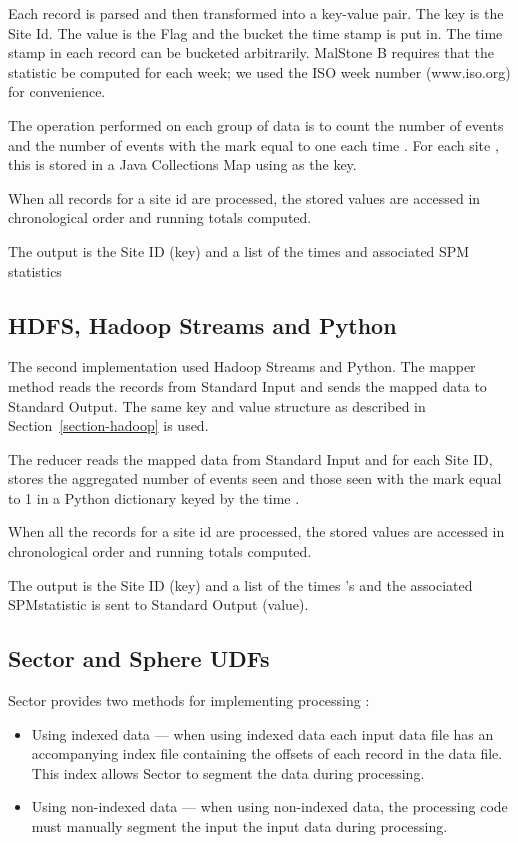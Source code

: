 \documentclass{acm_proc_article-sp}
\def\spm{\mbox{SPM}}
\def\malstone{MalStone } \def\malgen{MalGen }
\begin{document}
Each record is parsed and then transformed into a key-value pair.  The
key is the Site Id.  The value is the Flag and the bucket the time
stamp is put in.  The time stamp in each record can be bucketed
arbitrarily.  \malstone B requires that the statistic be computed for
each week; we used the ISO week number (www.iso.org) for convenience.

The operation performed on each group of data is to count the number
of events and the number of events with the mark equal to one
each time .  For each site , this is stored in a Java Collections
Map using  as the key.

When all records for a site id are processed, the stored values are
accessed in chronological order and running totals computed.

The output is the Site ID (key)  and a list of the times  and 
associated SPM statistics 

\subsection{HDFS, Hadoop Streams and Python}

The second implementation used Hadoop Streams \cite{Hadoop:2010} and 
Python.  The mapper method reads the records from Standard Input
and sends the mapped data to Standard Output.  The same key and value structure
as described in Section~\ref{section-hadoop} is used.

The reducer reads the mapped data from Standard Input and for each
Site ID, stores the aggregated number of events seen and those seen
with the mark equal to 1 in a Python dictionary keyed by the time .

When all the records for a site id are processed, the stored values
are accessed in chronological order and running totals computed.

The output is the Site ID (key) and a list of the times 's and the
associated \spm  statistic  is sent to Standard Output (value).

\subsection{Sector and Sphere UDFs}

Sector provides two methods for implementing processing  \cite{Grossman:PTRSA09}: 

\begin{itemize}

\item Using indexed data --- when using indexed data each input data
  file has an accompanying index file containing the offsets of each
  record in the data file. This index allows Sector to segment the
  data during processing.

\item Using non-indexed data --- when using non-indexed data, the
  processing code must manually segment the input the input data during processing.

\end{itemize}
\end{document}
